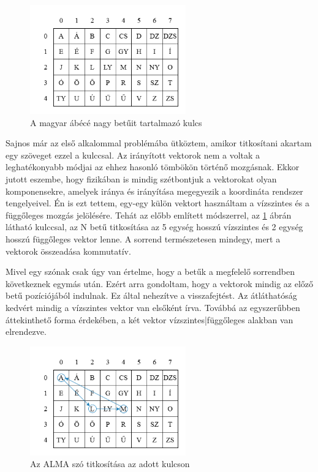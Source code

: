 \documentclass[12pt]{report} %
\begin{document}
\begin{figure}[H]
    \centering %
    \includegraphics[width=0.6\textwidth]{Figures/MyAlgorithm1.png} %
    \caption{A magyar ábécé nagy betűit tartalmazó kulcs} %
    \label{fig:MyAlgorithm1} %
\end{figure}

Sajnos már az első alkalommal problémába ütköztem, amikor titkosítani akartam egy szöveget ezzel a kulccsal. Az irányított vektorok nem a voltak a leghatékonyabb módjai az ehhez hasonló tömbökön történő mozgásnak. Ekkor jutott eszembe, hogy fizikában is mindig szétbontjuk a vektorokat olyan komponensekre, amelyek iránya és irányítása megegyezik a koordináta rendszer tengelyeivel. Én is ezt tettem, egy-egy külön vektort használtam a vízszintes és a  függőleges mozgás jelölésére. Tehát az előbb említett módszerrel, az \ref{fig:MyAlgorithm1} ábrán látható kulccsal, az N betű titkosítása az 5 egység hosszú vízszintes és 2 egység hosszú függőleges vektor lenne. A sorrend természetesen mindegy, mert a vektorok összeadása kommutatív.

Mivel egy szónak csak úgy van értelme, hogy a betűk a megfelelő sorrendben következnek egymás után. Ezért arra gondoltam, hogy a vektorok mindig az előző betű pozíciójából indulnak. Ez által nehezítve a visszafejtést. Az átláthatóság kedvért mindig a vízszintes vektor van elsőként írva. Továbbá az egyszerűbben áttekinthető forma érdekében, a két vektor vízszintes|függőleges alakban van elrendezve.

\begin{figure}[H]
    \centering %
    \includegraphics[width=0.6\textwidth]{Figures/MyAlgorithm2.png} %
    \caption{Az ALMA szó titkosítása az adott kulcson} %
    \label{fig:MyAlgorithm2} %
\end{figure}
\end{document}
